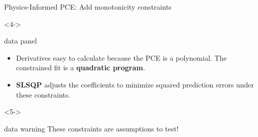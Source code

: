 \begin{frame}{Physics-Informed PCE: Add monotonicity constraints}
  \begin{uncoverenv}<4->
  \begin{beamercolorbox}[sep=1.7mm,wd=\textwidth]{data panel}
    \small
    \begin{itemize}
      \setlength{\itemsep}{1pt}
      \vspace{-1.5mm}
      \item Derivatives easy to calculate because the PCE is a polynomial. The constrained fit is a \textbf{quadratic program}.
      \item \textbf{SLSQP} adjusts the coefficients to minimize squared prediction errors under these constraints.
    \end{itemize}
    \vspace{-1.5mm}
  \end{beamercolorbox}
  \end{uncoverenv}
\par\vfill
  \begin{uncoverenv}<5->
  \begin{beamercolorbox}[sep=1.7mm,wd=\textwidth]{data warning}
    \small These constraints are assumptions to test!
  \end{beamercolorbox}
  \end{uncoverenv}
\end{frame}


